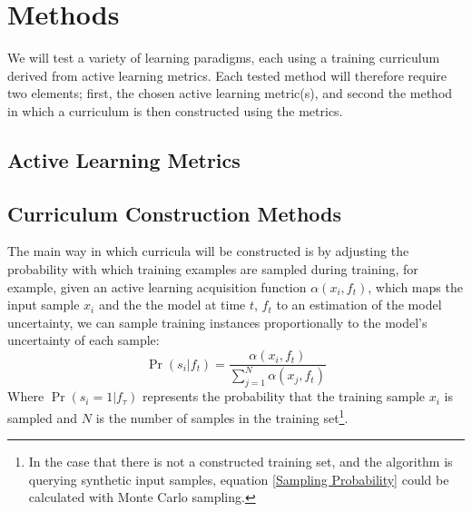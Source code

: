 \documentclass[a4paper,11pt]{article}
\begin{document}
\section{Methods}
We will test a variety of learning paradigms, each using a training curriculum derived from active learning metrics. Each tested method will therefore require two elements; first, the chosen active learning metric(s), and second the method in which a curriculum is then constructed using the metrics. 
\subsection*{Active Learning Metrics}

\subsection*{Curriculum Construction Methods}
The main way in which curricula will be constructed is by adjusting the probability with which training examples are sampled during training, for example, given an active learning acquisition function $\alpha(x_i,f_t)$, which maps the input sample $x_i$ and the the model at time $t$, $f_t$ to an estimation of the model uncertainty, we can sample training instances proportionally to the model's uncertainty of each sample:
\begin{equation}\label{Sampling Probability}
\Pr(s_i|f_t) = \frac{\alpha(x_i,f_t)}{\sum_{j=1}^{N}\alpha(x_j,f_t)}
\end{equation}
Where $\Pr(s_i = 1|f_\tau)$ represents the probability that the training sample $x_i$ is sampled and $N$ is the number of samples in the training set\footnote{In the case that there is not a constructed training set, and the algorithm is querying synthetic input samples, equation \ref{Sampling Probability} could be calculated with Monte Carlo sampling.}. 
\end{document}
